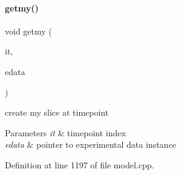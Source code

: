 \paragraph{\texorpdfstring{getmy()}{getmy()}}
{\footnotesize\ttfamily void getmy (\begin{DoxyParamCaption}\item[{const int}]{it,  }\item[{const \mbox{\hyperlink{classamici_1_1_exp_data}{Exp\+Data}} $\ast$}]{edata }\end{DoxyParamCaption})\hspace{0.3cm}{\ttfamily [protected]}}

create my slice at timepoint 
\begin{DoxyParams}{Parameters}
{\em it} & timepoint index \\
\hline
{\em edata} & pointer to experimental data instance \\
\hline
\end{DoxyParams}


Definition at line 1197 of file model.\+cpp.

